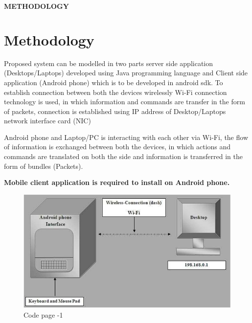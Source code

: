 \documentclass[12pt]{article}
\begin{document}
\clearpage

\begin{center}

 \Large \textbf{METHODOLOGY }\\[10mm]
 \end{center}
 \section{Methodology }
Proposed system can be modelled in two parts server side application
(Desktops/Laptops) developed using Java programming language and Client side
application (Android phone) which is to be developed in android sdk. To establish
connection between both the devices wirelessly Wi-Fi connection technology is
used, in which information and commands are transfer in the form of packets,
connection is established using IP address of Desktop/Laptops network interface
card (NIC)\par
Android phone and Laptop/PC is interacting with each other via Wi-Fi, the flow of
information is exchanged between both the devices, in which actions and
commands are translated on both the side and information is transferred in the
form of bundles (Packets).\\[5mm]\par
\textbf{Mobile client application is required to install on Android phone.}
 
 \begin{figure}[h]
 \centering
 \includegraphics[scale=.6]{Methodology}
  \caption{Code page -1 }
 \end{figure}
 
\end{document}
